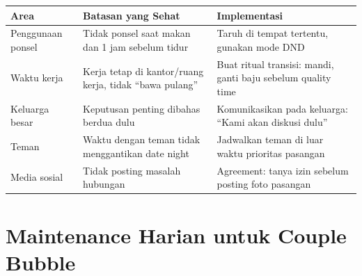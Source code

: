 \begin{center}
\renewcommand{\arraystretch}{1.5}
\begin{tabular}{|>{\raggedright}p{4cm}|>{\raggedright}p{5cm}|>{\raggedright\arraybackslash}p{5cm}|}
\hline
\rowcolor{sagegreen!20}
\textbf{Area} & \textbf{Batasan yang Sehat} & \textbf{Implementasi} \\
\hline
Penggunaan ponsel & Tidak ponsel saat makan dan 1 jam sebelum tidur & Taruh di tempat tertentu, gunakan mode DND \\
\hline
Waktu kerja & Kerja tetap di kantor/ruang kerja, tidak ``bawa pulang'' & Buat ritual transisi: mandi, ganti baju sebelum quality time \\
\hline
Keluarga besar & Keputusan penting dibahas berdua dulu & Komunikasikan pada keluarga: ``Kami akan diskusi dulu'' \\
\hline
Teman & Waktu dengan teman tidak menggantikan date night & Jadwalkan teman di luar waktu prioritas pasangan \\
\hline
Media sosial & Tidak posting masalah hubungan & Agreement: tanya izin sebelum posting foto pasangan \\
\hline
\end{tabular}
\end{center}

\section{Maintenance Harian untuk Couple Bubble}

